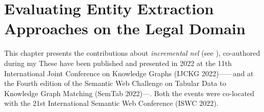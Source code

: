 \chapter{Evaluating Entity Extraction Approaches on the Legal Domain}
\label{chap:extraction}

This chapter presents the contributions about \emph{incremental \acl{nel}} (see ), co-authored during my \phd  These have been published and presented in 2022 at the 11th International Joint Conference on Knowledge Graphs (IJCKG 2022)---\textcite{ijckg2022}---and at the Fourth edition of the Semantic Web Challenge on Tabular Data to Knowledge Graph Matching (SemTab 2022)---\textcite{mammotab}. Both the events were co-located with the 21st International Semantic Web Conference (ISWC 2022).

